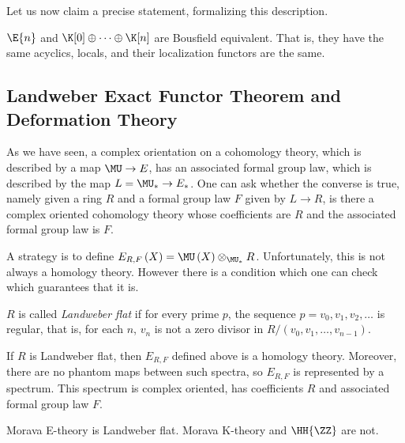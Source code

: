 Let us now claim a precise statement, formalizing this description.

\begin{theorem}
	$\E{n}$ and $\K[0] \oplus \cdots \oplus \K[n]$ are Bousfield equivalent.
	That is, they have the same acyclics, locals, and their localization functors are the same.
\end{theorem}




\subsection{Landweber Exact Functor Theorem and Deformation Theory}

As we have seen, a complex orientation on a cohomology theory, which is described by a map $\MU \to E$, has an associated formal group law, which is described by the map $L = \MU_* \to E_*$.
One can ask whether the converse is true, namely given a ring $R$ and a formal group law $F$ given by $L \to R$, is there a complex oriented cohomology theory whose coefficients are $R$ and the associated formal group law is $F$.

A strategy is to define $E_{R,F}\left(X\right) = \MU\left(X\right) \otimes_{\MU_*} R$.
Unfortunately, this is not always a homology theory.
However there is a condition which one can check which guarantees that it is.

\begin{definition}
	$R$ is called \emph{Landweber flat} if for every prime $p$, the sequence $p = v_0, v_1, v_2, \dotsc$ is regular,
	that is, for each $n$, $v_n$ is not a zero divisor in $R/\left(v_0, v_1, \dotsc, v_{n-1}\right)$.
\end{definition}

\begin{theorem}
	If $R$ is Landweber flat, then $E_{R,F}$ defined above is a homology theory.
	Moreover, there are no phantom maps between such spectra, so $E_{R,F}$ is represented by a spectrum.
	This spectrum is complex oriented, has coefficients $R$ and associated formal group law $F$.
\end{theorem}

\begin{example}
	Morava E-theory is Landweber flat.
	Morava K-theory and $\HH{\ZZ}$ are not.
\end{example}

